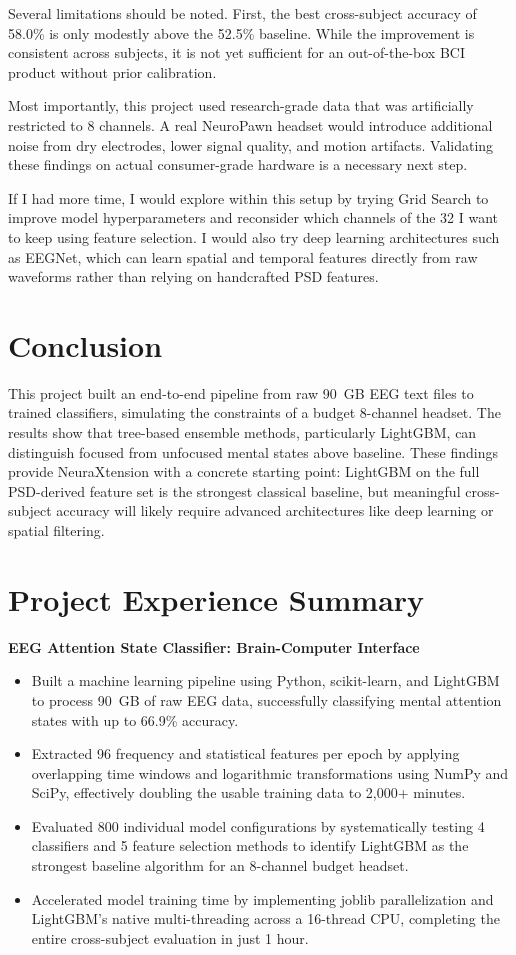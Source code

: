 \documentclass[12pt]{article}
\begin{document}
Several limitations should be noted. First, the best cross-subject accuracy of 58.0\% is only modestly above the 52.5\% baseline. While the improvement is consistent across subjects, it is not yet sufficient for an out-of-the-box BCI product without prior calibration.

Most importantly, this project used research-grade data that was artificially restricted to 8 channels. A real NeuroPawn headset would introduce additional noise from dry electrodes, lower signal quality, and motion artifacts. Validating these findings on actual consumer-grade hardware is a necessary next step.

If I had more time, I would explore within this setup by trying Grid Search to improve model hyperparameters and reconsider which channels of the 32 I want to keep using feature selection. I would also try deep learning architectures such as EEGNet, which can learn spatial and temporal features directly from raw waveforms rather than relying on handcrafted PSD features.

\section{Conclusion}

This project built an end-to-end pipeline from raw 90~GB EEG text files to trained classifiers, simulating the constraints of a budget 8-channel headset. The results show that tree-based ensemble methods, particularly LightGBM, can distinguish focused from unfocused mental states above baseline. These findings provide NeuraXtension with a concrete starting point: LightGBM on the full PSD-derived feature set is the strongest classical baseline, but meaningful cross-subject accuracy will likely require advanced architectures like deep learning or spatial filtering.

\newpage
\section*{Project Experience Summary}

\textbf{EEG Attention State Classifier: Brain-Computer Interface}
\begin{itemize}
    \item Built a machine learning pipeline using Python, scikit-learn, and LightGBM to process 90~GB of raw EEG data, successfully classifying mental attention states with up to 66.9\% accuracy.
    \item Extracted 96 frequency and statistical features per epoch by applying overlapping time windows and logarithmic transformations using NumPy and SciPy, effectively doubling the usable training data to 2,000+ minutes.
    \item Evaluated 800 individual model configurations by systematically testing 4 classifiers and 5 feature selection methods to identify LightGBM as the strongest baseline algorithm for an 8-channel budget headset.
    \item Accelerated model training time by implementing joblib parallelization and LightGBM's native multi-threading across a 16-thread CPU, completing the entire cross-subject evaluation in just 1 hour.
\end{itemize}
\end{document}
